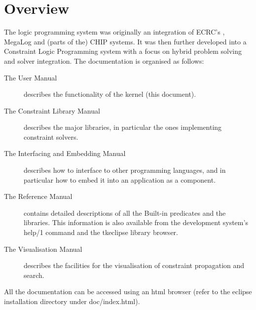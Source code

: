 \section{Overview}
The {\eclipse} logic programming system was originally an integration of
ECRC's \sepia, MegaLog and (parts of the) CHIP systems.
It was then further developed into a Constraint Logic Programming system
with a focus on hybrid problem solving and solver integration.
The documentation is organised as follows:
\begin{description}
\item [The User Manual] describes the functionality
of the {\eclipse} kernel (this document).
\item [The Constraint Library Manual] describes the major {\eclipse} libraries,
in particular the ones implementing constraint solvers.
\item [The Interfacing and Embedding Manual] describes how to interface
{\eclipse} to other programming languages, and in particular how to embed
it into an application as a component.
\item [The Reference Manual] contains detailed descriptions of all the
Built-in predicates and the libraries. This information is also available
from the development system's help/1 command and the tkeclipse library
browser.
\item [The Visualisation Manual] describes the facilities for the
visualisation of constraint propagation and search.
\end{description}
All the documentation can be accessed using an html browser
(refer to the eclipse installation directory under doc/index.html).

